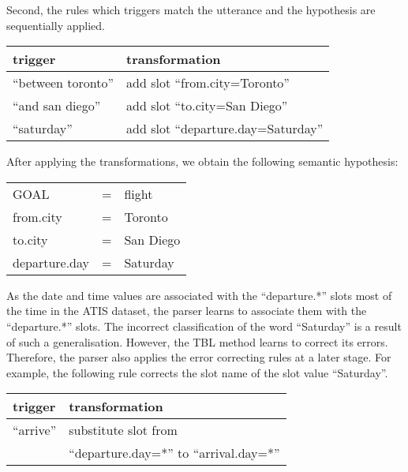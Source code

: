 \documentclass{article}
\begin{document}
Second, the rules which triggers match the utterance and the hypothesis are sequentially applied. 

\vspace{.15cm}
\begin{tabular}{ll}
  trigger & transformation \\
  \hline 
  ``between toronto''     & add slot ``from.city=Toronto'' \\
  ``and san diego''       & add slot ``to.city=San Diego'' \\
  ``saturday''            & add slot ``departure.day=Saturday'' \\
\end{tabular} 
\vspace{.15cm}

After applying the transformations, we obtain the following semantic hypothesis: 

\vspace{.15cm}
\begin{tabular}{lll}
  GOAL          & = & flight \\
  from.city     & = & Toronto \\
  to.city       & = & San Diego \\
  departure.day & = & Saturday \\
\end{tabular} 
\vspace{.15cm}



As the date and time values are associated with the ``departure.*'' slots most of the time in the ATIS dataset,  
the parser learns to associate them with the ``departure.*'' slots. The incorrect classification of the word ``Saturday'' is a result of such a generalisation. 
However, the TBL method learns to correct its errors. Therefore, the parser also applies the error correcting rules at a later stage. For example, the following rule corrects the slot name of the slot value ``Saturday''.

\vspace{.15cm}
\begin{tabular}{ll}
  trigger & transformation \\
  \hline 
  ``arrive''            & substitute slot from\\
                        & ``departure.day=*'' to ``arrival.day=*'' \\
\end{tabular} 
\vspace{.15cm}
\end{document}
